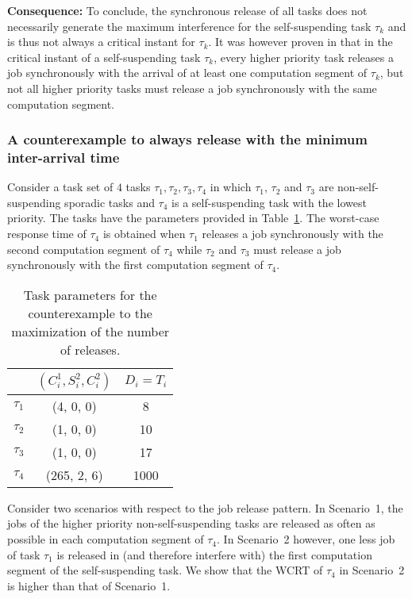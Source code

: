{\bf Consequence:} To conclude, the synchronous release of all tasks does not necessarily generate the maximum interference for the self-suspending task $\tau_k$ and is thus not always a critical instant for $\tau_k$. 
It was however proven in \cite{ecrts15nelissen} that in the critical instant of a self-suspending task $\tau_k$, every higher priority task releases a job synchronously with the arrival of at least one computation segment of $\tau_k$, but not all higher priority tasks must release a job synchronously with the same computation segment.

\subsubsection{A counterexample to 
always release with the minimum inter-arrival time}

Consider a task set of $4$ tasks $\tau_1, \tau_2, \tau_3, \tau_4$ in which $\tau_1$, $\tau_2$ and $\tau_3$ are non-self-suspending sporadic tasks and $\tau_4$ is a self-suspending task with the lowest priority. The tasks have the parameters provided in Table~\ref{table:ex-num-releases}. The worst-case response time of $\tau_4$ is obtained when $\tau_1$ releases a job synchronously with the second computation segment of $\tau_4$ while $\tau_2$ and $\tau_3$ must release a job synchronously with the first computation segment of $\tau_4$.

\begin{table}[t]
\centering
    \begin{tabular}{|c|c|c|}
 \hline
        & $(C_i^1, S_i^2, C_i^2)$ &  $D_i=T_i$\\ 
        \hline
        $\tau_1$ & (4, 0, 0) &  8\\ 
        $\tau_2$ &  (1, 0, 0) & 10 \\ 
        $\tau_3$ & (1, 0, 0) & 17 \\
        $\tau_4$ & (265, 2, 6) & 1000\\
        \hline
    \end{tabular} 
    \caption{Task parameters for the counterexample to the maximization of the number of releases.}
    \label{table:ex-num-releases}
\end{table}

Consider two scenarios with respect to the job release pattern. In Scenario~1, the jobs of the higher priority non-self-suspending tasks are released as often as possible in each computation segment of $\tau_4$. In Scenario~2 however, one less job of task $\tau_1$ is released in (and therefore interfere with) the first computation segment of the self-suspending task. We show that the WCRT of $\tau_4$ in Scenario~2 is higher than that of Scenario~1. 

